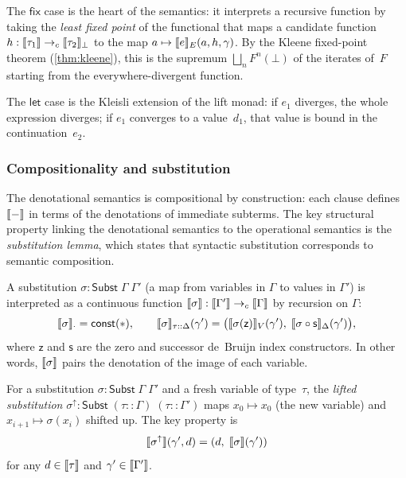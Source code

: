 The $\mathsf{fix}$ case is the heart of the semantics: it interprets
a recursive function by taking the \emph{least fixed point} of the
functional that maps a candidate function~$h : \llbracket \tau_1 \rrbracket \to_c
\llbracket \tau_2 \rrbracket_\bot$ to the map $a \mapsto \llbracket e \rrbracket_E(a, h, \gamma)$.
By the Kleene fixed-point theorem (\cref{thm:kleene}), this
is the supremum $\bigsqcup_{n} F^n(\bot)$ of the iterates of~$F$
starting from the everywhere-divergent function.

The $\mathsf{let}$ case is the Kleisli extension of the lift monad:
if $e_1$ diverges, the whole expression diverges; if $e_1$ converges
to a value~$d_1$, that value is bound in the continuation~$e_2$.

\subsubsection*{Compositionality and substitution}

The denotational semantics is compositional by construction: each clause
defines $\llbracket - \rrbracket$ in terms of the denotations of immediate subterms.
The key structural property linking the denotational semantics to the
operational semantics is the \emph{substitution lemma}, which states that
syntactic substitution corresponds to semantic composition.

\begin{definition}
\label{def:sem-subst}
A substitution $\sigma : \mathsf{Subst}\;\Gamma\;\Gamma'$ (a map from
variables in $\Gamma$ to values in $\Gamma'$) is interpreted as a
continuous function $\llbracket \sigma \rrbracket : \llbracket \Gamma' \rrbracket \to_c \llbracket \Gamma \rrbracket$
by recursion on $\Gamma$:
\[
  \llbracket \sigma \rrbracket_{\cdot} = \mathsf{const}(\ast), \qquad
  \llbracket \sigma \rrbracket_{\tau::\Delta}(\gamma') =
  \bigl(\llbracket \sigma(\mathsf{z}) \rrbracket_V(\gamma'),\;
        \llbracket \sigma \circ \mathsf{s} \rrbracket_\Delta(\gamma')\bigr),
\]
where $\mathsf{z}$ and $\mathsf{s}$ are the zero and successor de~Bruijn
index constructors.  In other words, $\llbracket \sigma \rrbracket$ pairs the denotation
of the image of each variable.
\end{definition}

For a substitution $\sigma : \mathsf{Subst}\;\Gamma\;\Gamma'$ and a
fresh variable of type~$\tau$, the \emph{lifted substitution}
$\sigma^{\uparrow} : \mathsf{Subst}\;(\tau :: \Gamma)\;(\tau :: \Gamma')$
maps $x_0 \mapsto x_0$ (the new variable) and $x_{i+1} \mapsto
\sigma(x_i)$ shifted up.  The key property is
\begin{equation}
\label{eq:sem-subst-ext}
  \llbracket \sigma^{\uparrow} \rrbracket(\gamma', d)
  = (d,\; \llbracket \sigma \rrbracket(\gamma'))
\end{equation}
for any $d \in \llbracket \tau \rrbracket$ and $\gamma' \in \llbracket \Gamma' \rrbracket$.

